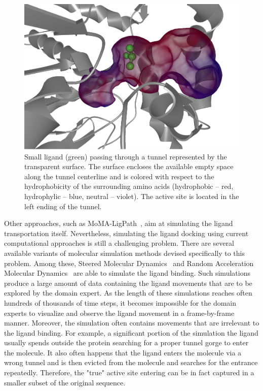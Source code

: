 \documentclass[twocolumn]{bmcart}%
\begin{document}
\begin{figure}[htb]
	\centering
  \includegraphics[width=1\linewidth]{img/tunnel.png}
  \caption{\label{fig:tunnel} Small ligand (green) passing through a tunnel represented by the transparent surface. The surface encloses the available empty space along the tunnel centerline and is colored with respect to the hydrophobicity of the surrounding amino acids (hydrophobic -- red, hydrophylic -- blue, neutral -- violet). The active site is located in the left ending of the tunnel.}
\end{figure}

Other approaches, such as MoMA-LigPath~\cite{Devaurs}, aim at simulating the ligand transportation itself.
Nevertheless, simulating the ligand docking using current computational approaches is still a challenging problem.
There are several available variants of molecular simulation methods devised specifically to this problem. 
Among these, Steered Molecular Dynamics~\cite{Isralewitz} and Random Acceleration Molecular Dynamics~\cite{Ludemann} are able to simulate the ligand binding. 
Such simulations produce a large amount of data containing the ligand movements that are to be explored by the domain expert.
As the length of these simulations reaches often hundreds of thousands of time steps, it becomes impossible for the domain experts to visualize and observe the ligand movement in a frame-by-frame manner.
Moreover, the simulation often contains movements that are irrelevant to the ligand binding.
For example, a significant portion of the simulation the ligand usually spends outside the protein searching for a proper tunnel gorge to enter the molecule. 
It also often happens that the ligand enters the molecule via a wrong tunnel and is then evicted from the molecule and searches for the entrance repeatedly.
Therefore, the "true" active site entering can be in fact captured in a smaller subset of the original sequence.
\end{document}
